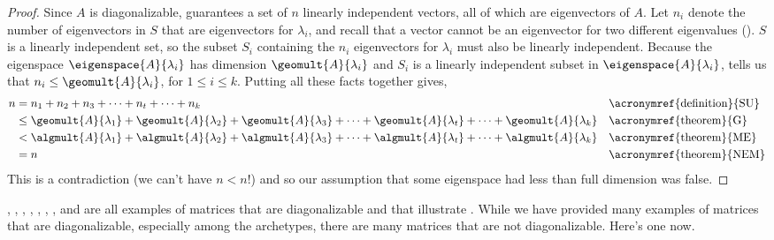 \begin{proof}
%
Since $A$ is diagonalizable,  guarantees a set of $n$ linearly independent vectors, all of which are eigenvectors of $A$.  Let $n_i$ denote the number of eigenvectors in $S$ that are eigenvectors for $\lambda_i$, and recall that a vector cannot be an eigenvector for two different eigenvalues ().  $S$ is a linearly independent set, so the subset $S_i$ containing the $n_i$ eigenvectors for $\lambda_i$ must also be linearly independent.  Because the eigenspace $\eigenspace{A}{\lambda_i}$ has dimension $\geomult{A}{\lambda_i}$ and $S_i$ is a linearly independent subset in $\eigenspace{A}{\lambda_i}$,  tells us that $n_i\leq\geomult{A}{\lambda_i}$, for $1\leq i\leq k$.
Putting all these facts together gives,
%
\begin{align*}
n
&=n_1+n_2+n_3+\cdots+n_t+\cdots+n_k
&&\text{\acronymref{definition}{SU}}\\
%
&\leq\geomult{A}{\lambda_1}+\geomult{A}{\lambda_2}+\geomult{A}{\lambda_3}+\cdots+\geomult{A}{\lambda_t}+\cdots+\geomult{A}{\lambda_k}
&&\text{\acronymref{theorem}{G}}\\
%
&<\algmult{A}{\lambda_1}+\algmult{A}{\lambda_2}+\algmult{A}{\lambda_3}+\cdots+\algmult{A}{\lambda_t}+\cdots+\algmult{A}{\lambda_k}&&\text{\acronymref{theorem}{ME}}\\
%
&=n
&&\text{\acronymref{theorem}{NEM}}
%
\end{align*}
%
This is a contradiction (we can't have $n<n$!) and so our assumption that some eigenspace had less than full dimension was false.
%
\end{proof}
%
,
,
,
,
,
,
,
 and
are all examples of matrices that are diagonalizable and that illustrate .  While we have provided many examples of matrices that are diagonalizable, especially among the archetypes, there are many matrices that are not diagonalizable.  Here's one now.
%
